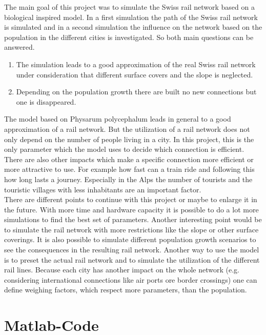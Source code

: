 \documentclass[11pt]{scrartcl}
\begin{document}
The main goal of this project was to simulate the Swiss rail network based on a biological inspired model. In a first simulation the path of the Swiss rail network is simulated and in a second simulation the influence on the network based on the population in the different cities is investigated. So both main questions can be answered.

\begin{enumerate}
\item The simulation leads to a good approximation of the real Swiss rail network under consideration that different surface covers and the slope is neglected.
\item Depending on the population growth there are built no new connections but one is disappeared.
\end{enumerate}

The model based on Physarum polycephalum leads in general to a good approximation of a rail network. But the utilization of a rail network does not only depend on the number of people living in a city. In this project, this is the only parameter which the model uses to decide which connection is efficient. There are also other impacts which make a specific connection more efficient or more attractive to use. For example how fast can a train ride and following this how long lasts a journey. Especially in the Alps the number of tourists and the touristic villages with less inhabitants are an important factor.\\

There are different points to continue with this project or maybe to enlarge it in the future. With more time and hardware capacity it is possible to do a lot more simulations to find the best set of parameters. Another interesting point would be to simulate the rail network with more restrictions like the slope or other surface coverings. It is also possible to simulate different population growth scenarios to see the consequences in the resulting rail network. Another way to use the model is to preset the actual rail network and to simulate the utilization of the different rail lines. Because each city has another impact on the whole network (e.g. considering international connections like air ports ore border crossings) one can define weighing factors, which respect more parameters, than the population.


\newpage
\appendix
\section{Matlab-Code}
\end{document}
